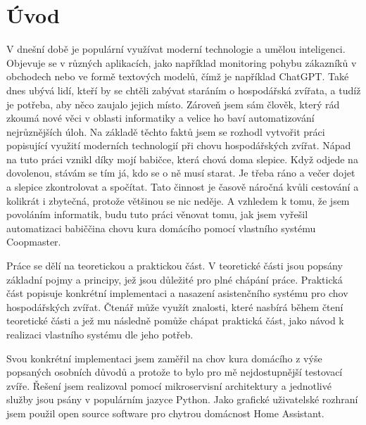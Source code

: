 \chapter{Úvod}\label{ch:uvod}

V dnešní době je populární využívat moderní technologie a umělou inteligenci.
Objevuje se v různých aplikacích, jako například monitoring pohybu
zákazníků v obchodech nebo ve formě textových modelů, čímž je například
ChatGPT.
Také dnes ubývá lidí, kteří by se chtěli zabývat staráním o hospodářská
zvířata, a tudíž je potřeba, aby něco zaujalo jejich místo.
Zároveň jsem sám člověk, který rád zkoumá nové věci v oblasti
informatiky a velice ho baví automatizování nejrůznějších úloh.
Na základě těchto faktů jsem se rozhodl vytvořit práci popisující
využití moderních technologií při chovu hospodářských zvířat.
Nápad na tuto práci vznikl díky mojí babičce, která chová doma slepice.
Když odjede na dovolenou, stávám se tím já, kdo se o ně musí starat.
Je třeba ráno a večer dojet a slepice zkontrolovat a spočítat.
Tato činnost je časově náročná kvůli cestování a kolikrát i zbytečná,
protože většinou se nic neděje.
A vzhledem k tomu, že jsem povoláním informatik, budu tuto práci věnovat
 tomu, jak jsem vyřešil automatizaci babiččina chovu kura domácího
pomocí vlastního systému Coopmaster.

\newline
Práce se dělí na teoretickou a praktickou část.
V teoretické části jsou popsány základní pojmy a principy, jež jsou důležité pro plné chápání práce.
Praktická část popisuje konkrétní implementaci a nasazení asistenčního systému pro chov hospodářských zvířat.
Čtenář může využít znalosti, které nasbírá během čtení teoretické části a jež mu následně pomůže chápat praktická část, jako návod k realizaci vlastního systému dle jeho potřeb.
\newline

Svou konkrétní implementaci jsem zaměřil na chov kura domácího z
 výše popsaných osobních důvodů a protože to bylo pro mě nejdostupnější
testovací zvíře. Řešení jsem realizoval pomocí mikroservisní
architektury a jednotlivé služby jsou psány v populárním jazyce Python.
Jako grafické uživatelské rozhraní jsem použil open source software pro
chytrou domácnost Home Assistant.
